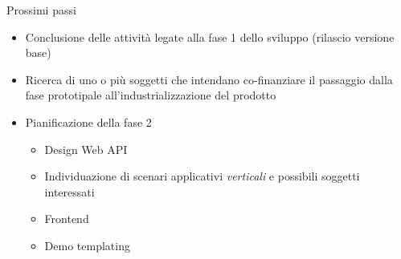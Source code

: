 \documentclass{beamer}
\begin{document}
\begin{frame}{Prossimi passi}
\begin{itemize}
  \pause
  \item Conclusione delle attivit\`a legate alla fase 1 dello sviluppo (rilascio versione base)
  \pause
  \item Ricerca di uno o pi\`u soggetti che intendano co-finanziare il passaggio dalla fase prototipale all'industrializzazione del prodotto
  \pause
  \item Pianificazione della fase 2
  \begin{itemize}
    \pause
    \item Design Web API
    \pause
    \item Individuazione di scenari applicativi \emph{verticali} e possibili soggetti interessati 
    \pause
    \item Frontend
    \pause
    \item Demo templating
  \end{itemize}
\end{itemize}
\end{frame}
\end{document}
